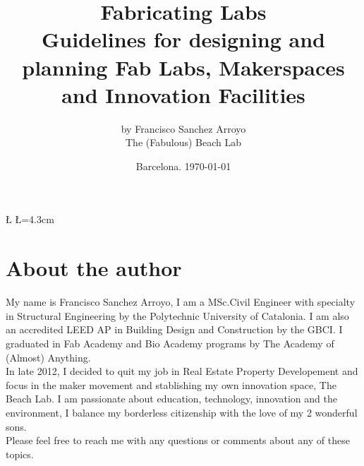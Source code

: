 \documentclass[a4paper,12pt,titlepage]{article}
\title{Fabricating Labs\\
\Huge \textbf{Guidelines for designing and planning Fab Labs, Makerspaces and Innovation Facilities}}
\author{
by Francisco Sanchez Arroyo\\
The (Fabulous) Beach Lab
}
\date{Barcelona. \today}
\begin{document}

\newcommand{\D}{6} %
\newcommand{\U}{5} %

\newdimen\R %
\R=3.5cm 
\newdimen\L %
\L=4.3cm


\newcommand{\A}{360/\D} %

\maketitle

\tableofcontents %
\clearpage






\pagestyle{fancy}

\section*{About the author}
My name is Francisco Sanchez Arroyo, I am a MSc.Civil Engineer with specialty in Structural Engineering by the Polytechnic University of Catalonia. I am also an accredited LEED AP in Building Design and Construction by the GBCI. I graduated in Fab Academy and Bio Academy programs by The Academy of (Almost) Anything.\\ 

In late 2012, I decided to quit my job in Real Estate Property Developement and focus in the maker movement and stablishing my own innovation space, The Beach Lab. I am passionate about education, technology, innovation and the environment, I balance my borderless citizenship with the love of my 2 wonderful sons.\\

Please feel free to reach me with any questions or comments about any of these topics.\\
\end{document}

